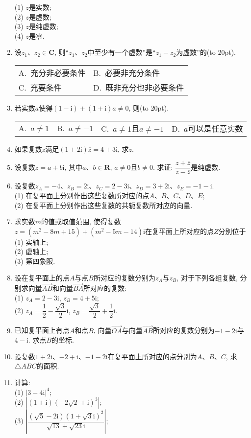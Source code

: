 \documentclass[10pt,a4paper]{article}
\newcommand{\bracket}[1]{(\hbox to #1pt{})}
\newcommand{\twoch}[4]{\par\begin{tabular}{p{.46\textwidth}p{.46\textwidth}}
A.~#1& B.~#2\\
C.~#3& D.~#4
\end{tabular}}
\newcommand{\fourch}[4]{\par\begin{tabular}{p{.23\textwidth}p{.23\textwidth}p{.23\textwidth}p{.23\textwidth}}
A.~#1 &B.~#2& C.~#3& D.~#4
\end{tabular}}
\begin{document}
\begin{enumerate}[1.]
(1) $z$是实数;\\
(2) $z$是虚数;\\
(3) $z$是纯虚数;\\
(4) $z$是零.
\item 设$z_1$、$z_2\in \mathbf{C}$, 则``$z_1$、$z_2$中至少有一个虚数''是``$z_1-z_2$为虚数''的\bracket{20}.
\twoch{充分非必要条件}{必要非充分条件}{充要条件}{既非充分也非必要条件}
\item 若实数$a$使得$(1-\mathrm{i})+(1+\mathrm{i})a\ne 0$, 则\bracket{20}.
\fourch{$a\ne 1$}{$a\ne -1$}{$a\ne 1$且$a\ne -1$}{$a$可以是任意实数}
\item 如果复数$z$满足$(1+2\mathrm{i})\overline z=4+3\mathrm{i}$, 求$z$.
\item 设复数$z=a+b\mathrm{i}$, 其中$a$、$b\in \mathbf{R}$, $a\ne 0$且$b\ne 0$. 求证: $\dfrac{z+\overline z}{z-\overline z}$是纯虚数.
\item 设复数$z_A=-4$、$z_B=2\mathrm{i}$、$z_C=2-3\mathrm{i}$、$z_D=3+2\mathrm{i}$、$z_E=-1-\mathrm{i}$.\\
(1) 在复平面上分别作出这些复数所对应的点$A$、$B$、$C$、$D$、$E$;\\
(2) 在复平面上分别作出这些复数的共轭复数所对应的向量.
\item 求实数$m$的值或取值范围, 使得复数$z=(m^2-8m+15)+(m^2-5m-14)\mathrm{i}$在复平面上所对应的点$Z$分别位于\\
(1) 实轴上;\\
(2) 虚轴上;\\
(3) 第四象限.
\item 设在复平面上的点$A$与点$B$所对应的复数分别为$z_A$与$z_B$, 对于下列各组复数, 分别求向量$\overrightarrow{AB}$和向量$\overrightarrow{BA}$所对应的复数:\\
(1) $z_A=2-3\mathrm{i}$, $z_B=4+5\mathrm{i}$;\\
(2) $z_A=\dfrac 12-\dfrac{\sqrt 3}2\mathrm{i}$, $z_B=\dfrac{\sqrt 3}2+\dfrac 12\mathrm{i}$.
\item 已知复平面上有点$A$和点$B$, 向量$\overrightarrow{OA}$与向量$\overrightarrow{AB}$所对应的复数分别为$-1-2\mathrm{i}$与$4-\mathrm{i}$. 求点$B$的坐标.
\item 设复数$1+2\mathrm{i}$、$-2+\mathrm{i}$、$-1-2\mathrm{i}$在复平面上所对应的点分别为$A$、$B$、$C$, 求$\triangle ABC$的面积.
\item 计算:\\
(1) $|3-4\mathrm{i}|^4$;\\
(2) $|(1+\mathrm{i})(-2\sqrt 2+\mathrm{i})^3|$;\\
(3) $|\dfrac{(\sqrt 5-2\mathrm{i})(1+\sqrt 3\mathrm{i})^2}{\sqrt{13}+\sqrt{23}\mathrm{i}}|$;\\

\end{enumerate}
\end{document}
